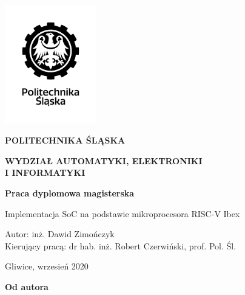 \documentclass[11pt,a4paper]{article}
\begin{document}
	\date{}
\begin{center}
	\centering

\includegraphics[width=4cm]{./rysunki/logo.jpg}
\\
\vspace{1.5cm}
 
\textbf{\Large POLITECHNIKA ŚLĄSKA}
\\
\vspace{0.5cm}
 
\textbf{\Large WYDZIAŁ AUTOMATYKI, ELEKTRONIKI}
\\
\vspace{0.1cm}
\textbf{\Large I INFORMATYKI}
\\
\vspace{0.5cm}


\vspace{3cm}
 
\textbf{\LARGE  Praca dyplomowa magisterska}
\\
\vspace{2cm}

\Large Implementacja SoC na podstawie mikroprocesora RISC-V Ibex
\vspace{3cm}

\begin{flushleft}

\Large Autor: inż. Dawid Zimończyk
\\
\Large Kierujący pracą: dr hab. inż. Robert Czerwiński, prof. Pol. Śl.
\\

\end{flushleft}
 \vspace{2.5cm}
\Large Gliwice, wrzesień 2020


\end{center}
\thispagestyle{empty}



\thispagestyle{empty}
\setcounter{page}{2}

\newpage

\begin{center}
\textbf {\Large Od autora}
\newpage
\end{center}
\large\tableofcontents 
\end{document}
